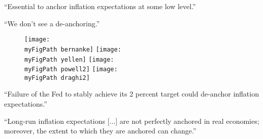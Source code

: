 \documentclass[10pt]{beamer}
\def \myFigPath {../../../figures/}
\begin{document}
\begin{frame}
	\label{central_bankers}
	``Essential to anchor inflation expectations at some low level.''
	
	\vspace{0.2cm}
	
	\hfill ``We don't see a de-anchoring.''

\begin{figure}[h!]
\texttt{[image: \\myFigPath bernanke]}
\texttt{[image: \\myFigPath yellen]}
\texttt{[image: \\myFigPath powell2]}
\texttt{[image: \\myFigPath draghi2]}
\label{central_bankers_talk}
\end{figure}

``Failure of the Fed to stably achieve its 2 percent target could de-anchor inflation expectations.''

	\vspace{0.4cm}
	
``Long-run inflation expectations [...] are not perfectly anchored in real economies; moreover, the extent to which they are anchored can change.''

%
%
%
%
	\end{frame}
\end{document}
